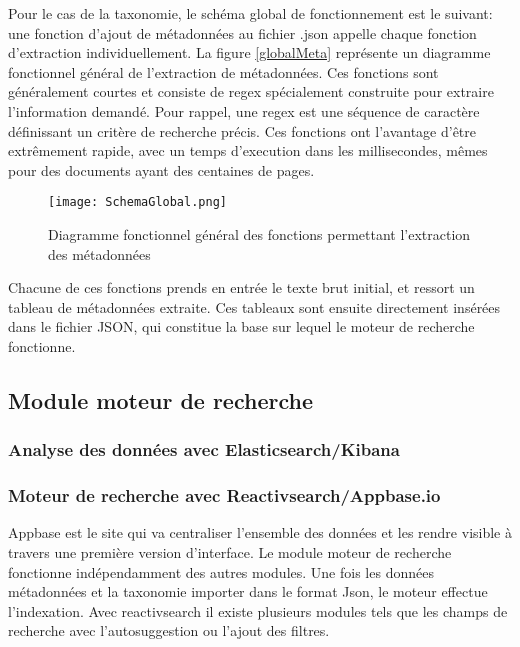 Pour le cas de la taxonomie, le schéma global de fonctionnement est le suivant: une fonction d'ajout de métadonnées au fichier .json appelle chaque fonction d'extraction individuellement.
La figure \ref{globalMeta} représente un diagramme fonctionnel général de l'extraction de métadonnées. 
Ces fonctions sont généralement courtes et consiste de regex spécialement construite pour extraire l'information demandé.
Pour rappel, une regex est une séquence de caractère définissant un critère de recherche précis.
Ces fonctions ont l'avantage d'être extrêmement rapide, avec un temps d'execution dans les millisecondes, mêmes pour des documents ayant des centaines de pages. 

\begin{figure}[h!]
  \centering
	\texttt{[image: SchemaGlobal.png]}
	\caption[]{Diagramme fonctionnel général des fonctions permettant l'extraction des métadonnées}
  \label{fig:globalMeta}
\end{figure}

Chacune de ces fonctions prends en entrée le texte brut initial, et ressort un tableau de métadonnées extraite.
Ces tableaux sont ensuite directement insérées dans le fichier JSON, qui constitue la base sur lequel le moteur de recherche fonctionne.


\subsection{Module moteur de recherche}
\subsubsection{Analyse des données avec Elasticsearch/Kibana}


\subsubsection{Moteur de recherche avec Reactivsearch/Appbase.io}
Appbase est le site qui va centraliser l'ensemble des données et les rendre visible à travers une première version d'interface.
Le module moteur de recherche fonctionne indépendamment des autres modules. Une fois les données métadonnées et la taxonomie importer dans le format Json, le moteur effectue l'indexation.
Avec reactivsearch il existe plusieurs modules tels que les champs de recherche avec l'autosuggestion ou l'ajout des filtres.  


